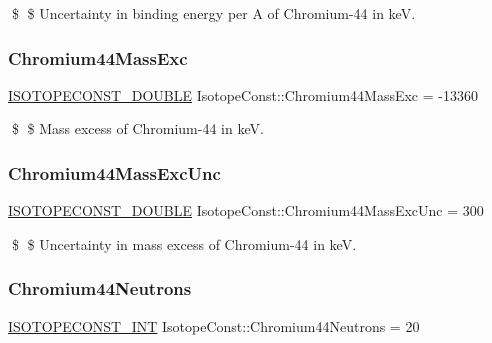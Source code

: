 \$ \$ Uncertainty in binding energy per A of Chromium-\/44 in keV. \mbox{\label{group___isotope_const-_chromium-_cr44_ga5bc93dc1d6a2c78323f55d2ee8a9c331}} 
\subsubsection{\texorpdfstring{Chromium44\+Mass\+Exc}{Chromium44MassExc}}
{\footnotesize\ttfamily \mbox{\hyperlink{group___isotope_const-_macros_ga8f45a7272ce02c0b4c65c44636ed719a}{I\+S\+O\+T\+O\+P\+E\+C\+O\+N\+S\+T\+\_\+\+D\+O\+U\+B\+LE}} Isotope\+Const\+::\+Chromium44\+Mass\+Exc = -\/13360}

\$ \$ Mass excess of Chromium-\/44 in keV. \mbox{\label{group___isotope_const-_chromium-_cr44_gaace8f6cb07c8daa2f6fa02586f7c57f3}} 
\subsubsection{\texorpdfstring{Chromium44\+Mass\+Exc\+Unc}{Chromium44MassExcUnc}}
{\footnotesize\ttfamily \mbox{\hyperlink{group___isotope_const-_macros_ga8f45a7272ce02c0b4c65c44636ed719a}{I\+S\+O\+T\+O\+P\+E\+C\+O\+N\+S\+T\+\_\+\+D\+O\+U\+B\+LE}} Isotope\+Const\+::\+Chromium44\+Mass\+Exc\+Unc = 300}

\$ \$ Uncertainty in mass excess of Chromium-\/44 in keV. \mbox{\label{group___isotope_const-_chromium-_cr44_ga7b9743533f1275086821f48376bb579e}} 
\subsubsection{\texorpdfstring{Chromium44\+Neutrons}{Chromium44Neutrons}}
{\footnotesize\ttfamily \mbox{\hyperlink{group___isotope_const-_macros_ga5f18360b3e99483a35c32d789e62621c}{I\+S\+O\+T\+O\+P\+E\+C\+O\+N\+S\+T\+\_\+\+I\+NT}} Isotope\+Const\+::\+Chromium44\+Neutrons = 20}

